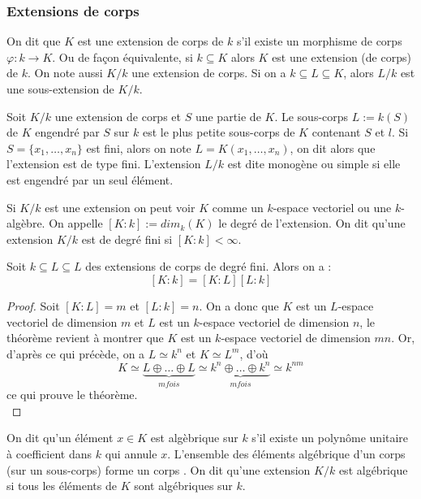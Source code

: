 \documentclass[a4paper]{article} %
\numberwithin{equation}{section}
\begin{document}
\subsubsection{Extensions de corps}
\label{defdegext}
On dit que $K$ est une extension de corps de $k$ s'il existe un morphisme de corps 
$\varphi : k \to K$. Ou de façon équivalente, si $k \subseteq K$ alors $K$ est une 
extension (de corps) de $k$. On note aussi $K/k$ une extension de corps.
Si on a $k\subseteq L \subseteq K$, alors $L/k$ est une sous-extension de
$K/k$.\par
Soit $K/k$ une extension de corps et $S$ une partie de $K$. Le sous-corps $L := 
k(S)$ de $K$ engendré par $S$ sur $k$ est le plus petite sous-corps de $K$ contenant 
$S$ et $l$. Si $S = \lbrace x_1,\dots,x_n \rbrace$ est fini, alors on note $L = 
K(x_1,\dots,x_n)$, on dit alors que l'extension est de type fini. L'extension $L/k$ 
est dite monogène ou simple si elle est engendré par un seul élément.\par
Si $K/k$ est une extension on peut voir $K$ comme un $k$-espace vectoriel ou une 
$k$-algèbre. On appelle $[K:k] := dim_k(K)$ le degré de l'extension. On dit qu'une 
extension $K/k$ est de degré fini si $[K:k] < \infty$.\par

\begin{thm}
Soit $k \subseteq L \subseteq L$ des extensions de corps de degré fini. Alors on 
a :
\[[K:k] = [K:L][L:k]\]
\end{thm}
\begin{proof}
Soit $[K:L] = m$ et $[L:k] = n$. On a donc que $K$ est un $L$-espace vectoriel de 
dimension $m$ et $L$ est un $k$-espace vectoriel de dimension $n$, le théorème 
revient à montrer que $K$ est un $k$-espace vectoriel de dimension $mn$. Or, 
d'après ce qui précède, on a $L \simeq k^n$ et $K \simeq L^m$, d'où
\[K \simeq \underbrace{L \oplus\dots\oplus L}_{m fois}\simeq\underbrace
{k^n\oplus\dots\oplus k^n}_{m fois} \simeq k^{nm}\]
ce qui prouve le théorème.\\
\end{proof}

On dit qu'un élément $x\in K$ est algèbrique sur $k$ s'il existe un polynôme 
unitaire à coefficient dans $k$ qui annule $x$. L'ensemble des éléments 
algébrique d'un corps (sur un sous-corps) forme un corps \cite[p.~64, théorème
1.14]{Per}. On dit qu'une extension $K/k$ est algébrique si tous les éléments de $K$ sont algébriques sur $k$.
\end{document}
